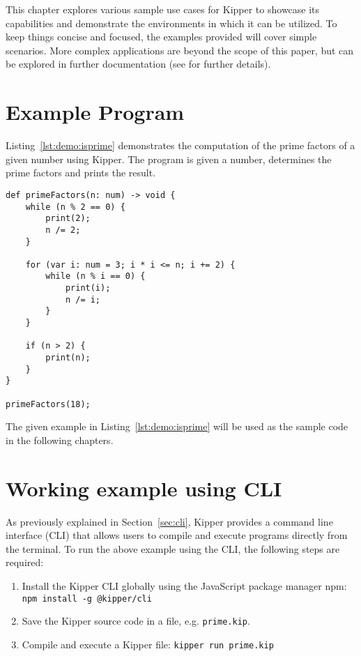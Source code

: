 
This chapter explores various sample use cases for Kipper to showcase its capabilities and demonstrate the environments in which it can be utilized. To keep things concise and focused, the examples provided will cover simple scenarios. More complex applications are beyond the scope of this paper, but can be explored in further documentation (see  for further details).

\section{Example Program}

Listing~\ref{lst:demo:isprime} demonstrates the computation of the prime factors of a given number using Kipper. The program is given a number, determines the prime factors and prints the result.

\begin{lstlisting}[language=Kipper,caption=A basic programs that determines the prime factors of an integer, label=lst:demo:isprime]
def primeFactors(n: num) -> void {
	while (n % 2 == 0) {
		print(2);
		n /= 2;
	}
	
	for (var i: num = 3; i * i <= n; i += 2) {
		while (n % i == 0) {
			print(i);
			n /= i;
		}
	}
	
	if (n > 2) {
		print(n);
	}
}

primeFactors(18);
\end{lstlisting}

The given example in Listing~\ref{lst:demo:isprime} will be used as the sample code in the following chapters.

\section{Working example using CLI}

As previously explained in Section~\ref{sec:cli}, Kipper provides a command line interface (CLI) that allows users to compile and execute programs directly from the terminal. To run the above example using the CLI, the following steps are required:

\begin{enumerate}
	\item Install the Kipper CLI globally using the JavaScript package manager npm: \lstinline|npm install -g @kipper/cli|
	\item Save the Kipper source code in a file, e.g. \texttt{prime.kip}.
	\item Compile and execute a Kipper file: \lstinline|kipper run prime.kip|
\end{enumerate}

